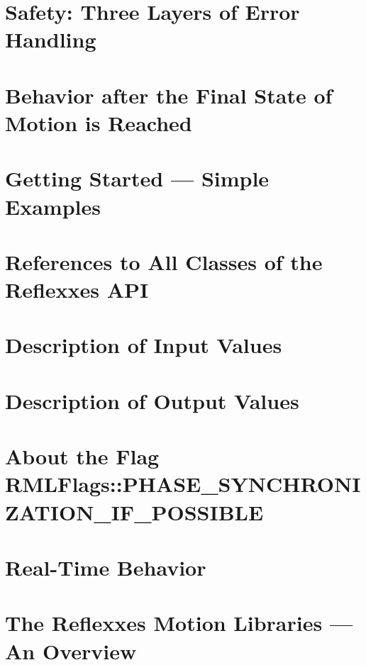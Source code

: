 \let\mypdfximage\pdfximage\def\pdfximage{\immediate\mypdfximage}\documentclass[twoside]{book}
\newcommand{\+}{\discretionary{\mbox{\scriptsize$\hookleftarrow$}}{}{}}
\begin{document}
\chapter{Safety\+: Three Layers of Error Handling}
\label{page_ErrorHandling}

\chapter{Behavior after the Final State of Motion is Reached}
\label{page_FinalStateReachedBehavior}

\chapter{Getting Started --- Simple Examples}
\label{page_GettingStarted}

\chapter{References to All Classes of the Reflexxes A\+PI}
\label{page_ImportantClasses}

\chapter{Description of Input Values}
\label{page_InputValues}

\chapter{Description of Output Values}
\label{page_OutputValues}

\chapter{About the Flag R\+M\+L\+Flags\+::P\+H\+A\+S\+E\+\_\+\+S\+Y\+N\+C\+H\+R\+O\+N\+I\+Z\+A\+T\+I\+O\+N\+\_\+\+I\+F\+\_\+\+P\+O\+S\+S\+I\+B\+LE}
\label{page_PSIfPossible}

\chapter{Real-\/\+Time Behavior}
\label{page_RealTimeBehavior}

\chapter{The Reflexxes Motion Libraries --- An Overview}
\label{page_ReflexxesMotionLibraries}

\end{document}
